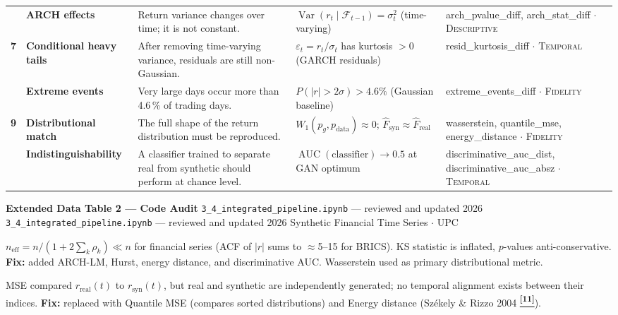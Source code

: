 \documentclass[10pt]{article}
\newcommand{\pagehead}[2]{%
  \begin{tcolorbox}[enhanced,arc=0pt,outer arc=0pt,boxrule=0pt,
    colback=Navy,colframe=Navy,
    top=5pt,bottom=5pt,left=8pt,right=8pt,
    before skip=0pt,after skip=10pt]
  {\color{white}\large\bfseries #1}%
  \ifx\relax#2\relax\else\\[1pt]{\color{blue!30!white}\small #2}\fi
  \hfill{\color{blue!20!white}\footnotesize Synthetic Financial Time Series $\cdot$ UPC}
  \end{tcolorbox}}
\newcommand{\auditrow}[5]{%
  \begin{tcolorbox}[mybox={#2}{#3},
    title={\textbf{[#1]}\quad #4},
    before skip=4pt, after skip=4pt, breakable]
  \small #5
  \end{tcolorbox}}
\newcommand{\tcite}[1]{%
  \hyperlink{R:#1}{\textsuperscript{\scriptsize\textbf{[#1]}}}}
\begin{document}
\begin{longtable}{%
  >{\bfseries\centering}p{}
  >{\bfseries}p{}
  p{}
  p{}
  p{}}
6 & ARCH effects &
  Return variance changes over time; it is not constant. &
  $\operatorname{Var}(r_t \mid \mathcal{F}_{t-1}) = \sigma^2_t$ (time-varying) &
  arch\_pvalue\_diff, arch\_stat\_diff $\cdot$ \textsc{Descriptive} \\

\rowcolor{TabOdd}
7 & Conditional heavy tails &
  After removing time-varying variance, residuals are still non-Gaussian. &
  $\varepsilon_t = r_t/\sigma_t$ has kurtosis $> 0$ (GARCH residuals) &
  resid\_kurtosis\_diff $\cdot$ \textsc{Temporal} \\

8 & Extreme events &
  Very large days occur more than 4.6\,\% of trading days. &
  $P(|r| > 2\sigma) > 4.6\%$ (Gaussian baseline) &
  extreme\_events\_diff $\cdot$ \textsc{Fidelity} \\

\rowcolor{TabOdd}
9 & Distributional match &
  The full shape of the return distribution must be reproduced. &
  $W_1(p_g, p_\text{data}) \approx 0$; $\hat{F}_\text{syn} \approx \hat{F}_\text{real}$ &
  wasserstein, quantile\_mse, energy\_distance $\cdot$ \textsc{Fidelity} \\

10 & Indistinguishability &
  A classifier trained to separate real from synthetic should perform at chance level. &
  $\operatorname{AUC}(\text{classifier}) \to 0.5$ at GAN optimum &
  discriminative\_auc\_dist, discriminative\_auc\_absz $\cdot$ \textsc{Temporal} \\

\bottomrule
\end{longtable}

\clearpage

\pagehead{Extended Data Table 2 --- Code Audit}
         {\texttt{3\_4\_integrated\_pipeline.ipynb} --- reviewed and updated 2026}

\vspace{4pt}

\auditrow{FIXED}{DRed}{RBg}%
  {KS / Welch tests assumed i.i.d.\ --- CRITICAL}%
  {$n_\text{eff} = n/(1+2\sum_k\rho_k) \ll n$ for financial series (ACF of $|r|$ sums to $\approx$5--15 for BRICS). KS statistic is inflated, $p$-values anti-conservative. \textbf{Fix:} added ARCH-LM, Hurst, energy distance, and discriminative AUC. Wasserstein used as primary distributional metric.}

\auditrow{FIXED}{DRed}{RBg}%
  {Pointwise MSE/MAE had no semantic meaning}%
  {MSE compared $r_\text{real}(t)$ to $r_\text{syn}(t)$, but real and synthetic are independently generated; no temporal alignment exists between their indices. \textbf{Fix:} replaced with Quantile MSE (compares sorted distributions) and Energy distance (Sz\'{e}kely \& Rizzo 2004\tcite{11}).}
\end{document}
